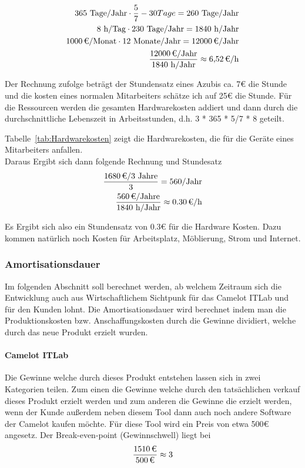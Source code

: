\begin{eqnarray}
	365 \mbox{ Tage/Jahr} \cdot \frac{5}{7} - 30 Tage = 260 \mbox{ Tage/Jahr}\\
	8 \mbox{ h/Tag} \cdot 230 \mbox{ Tage/Jahr} = 1840 \mbox{ h/Jahr}\\
	\eur{1000}\mbox{/Monat} \cdot 12 \mbox{ Monate/Jahr} = \eur{12000} \mbox{/Jahr}\\
	\frac{\eur{12000} \mbox{/Jahr}}{1840 \mbox{ h/Jahr}} \approx \eur{6,52}\mbox{/h}
\end{eqnarray}
	
Der Rechnung zufolge beträgt der Stundensatz eines Azubis ca. 7€ die Stunde und die kosten eines normalen Mitarbeiters schätze ich auf 25€ die Stunde. Für die Ressourcen werden die gesamten Hardwarekosten addiert und dann durch die durchschnittliche Lebenszeit in Arbeitsstunden, d.h. 3 * 365 * 5/7 * 8 geteilt.
	
Tabelle~\ref{tab:Hardwarekosten} zeigt die Hardwarekosten, die für die Geräte eines Mitarbeiters anfallen.
\\
	
Daraus Ergibt sich dann folgende Rechnung und Stundesatz
\begin{eqnarray}
	\frac{\eur{1680} \mbox{/3 Jahre}}{3} = 560 \mbox{/Jahr}\\
	\frac{\eur{560} \mbox{/Jahre}}{1840 \mbox{ h/Jahr}} \approx \eur{0.30}\mbox{/h}
\end{eqnarray}

Es Ergibt sich also ein Stundensatz von 0.3€ für die Hardware Kosten. Dazu kommen natürlich noch Kosten für Arbeitsplatz, Möblierung, Strom und Internet.

\subsubsection{Amortisationsdauer}
\label{sec:Amortisationsdauer}
Im folgenden Abschnitt soll berechnet werden, ab welchem Zeitraum sich die Entwicklung auch aus Wirtschaftlichem Sichtpunk für das Camelot ITLab und für den Kunden lohnt. Die Amortisationsdauer wird berechnet indem man die Produktionskosten bzw. Anschaffungskosten durch die Gewinne dividiert, welche durch das neue Produkt erzielt wurden.

\paragraph{Camelot ITLab}
Die Gewinne welche durch dieses Produkt entstehen lassen sich in zwei Kategorien teilen. Zum einen die Gewinne welche durch den tatsächlichen verkauf dieses Produkt erzielt werden und zum anderen die Gewinne die erzielt werden, wenn der Kunde außerdem neben diesem Tool dann auch noch andere Software der Camelot kaufen möchte. Für diese Tool wird ein Preis von etwa 500€ angesetz. Der Break-even-point (Gewinnschwell) liegt bei
\begin{eqnarray}
\frac{\eur{1510}}{\eur{500}} \approx 3 
\end{eqnarray}

